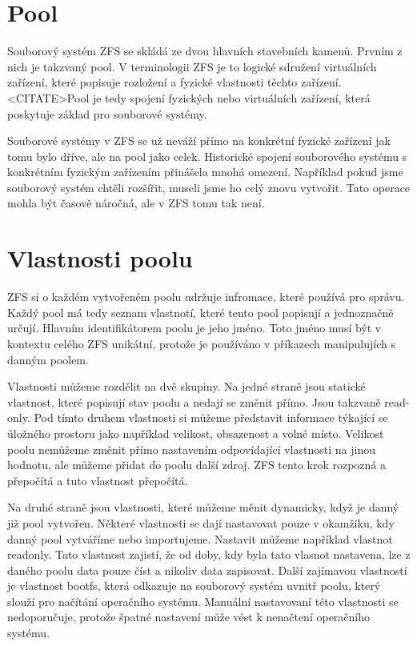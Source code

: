 \section{Pool}
Souborový systém ZFS se skládá ze dvou hlavních stavebních kamenů. Prvním z nich je takzvaný pool. V terminologii ZFS je to logické sdružení virtuálních zařízení, které popisuje rozložení a fyzické vlastnosti těchto zařízení.<CITATE>Pool je tedy spojení fyzických nebo virtuálních zařízení, která poskytuje základ pro souborové systémy.

Souborové systémy v ZFS se už neváží přímo na konkrétní fyzické zařízení jak tomu bylo dříve, ale na pool jako celek. Historické spojení souborového systému s konkrétním fyzickým zařízením přinášela mnohá omezení. Například pokud jsme souborový systém chtěli rozšířit, museli jsme ho celý znovu vytvořit. Tato operace mohla být časově náročná, ale
v ZFS tomu tak není.
\section{Vlastnosti poolu}
ZFS si o každém vytvořeném poolu udržuje infromace, které používá pro správu. Každý pool má tedy seznam vlastnotí, které tento pool popisují a jednoznačně určují.
Hlavním identifikátorem poolu je jeho jméno. Toto jméno musí být v kontextu celého ZFS unikátní, protože je používáno v příkazech manipulujích s danným poolem.

Vlastnosti můžeme rozdělit na dvě skupiny. Na jedné straně jsou statické vlastnost, které popisují stav poolu a nedají se změnit přímo. Jsou takzvaně read-only. Pod tímto druhem vlastnosti si můžeme představit informace týkající se úložného prostoru jako například velikost, obsazenost a volné místo. Velikost poolu nemůžeme změnit přímo nastavením odpovídající vlastnosti na jinou hodnotu, ale můžeme přidat do poolu další zdroj. ZFS tento krok rozpozná a přepočítá a tuto vlastnost přepočítá.

Na druhé straně jsou vlastnosti, které můžeme měnit dynamicky, když je danný již pool vytvořen. Některé vlastnosti se dají nastavovat pouze v okamžiku, kdy danný pool vytváříme nebo importujeme. Nastavit můžeme například vlastnot readonly. Tato vlastnost zajistí, že od doby, kdy byla tato vlasnot nastavena, lze z daného poolu data pouze číst a nikoliv data zapisovat. Další zajímavou vlastností je vlastnost bootfs, která odkazuje na souborový systém uvnitř poolu, který slouží pro načítání operačního systému. Manuální nastavovaní této vlastnosti se nedoporučuje, protože špatné nastavení může vést k nenačtení operačního systému.

